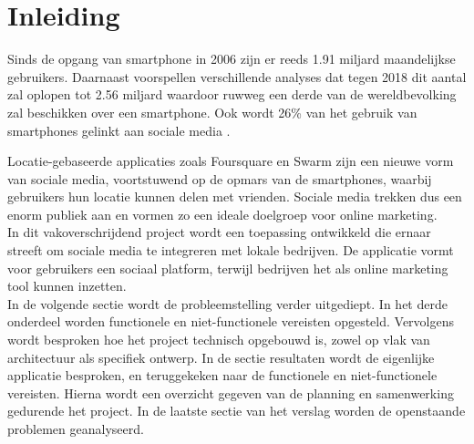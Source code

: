\chapter{Inleiding}

Sinds de opgang van smartphone in 2006 zijn er reeds 1.91 miljard maandelijkse gebruikers. Daarnaast voorspellen verschillende analyses dat tegen 2018 dit aantal zal oplopen tot 2.56 miljard waardoor ruwweg een derde van de wereldbevolking zal beschikken over een smartphone.  Ook wordt 26\% van het gebruik van smartphones gelinkt aan sociale media \cite{smartphone_sales}. 

Locatie-gebaseerde applicaties zoals Foursquare\cite{foursquare} en Swarm\cite{swarm} zijn een nieuwe vorm van sociale media, voortstuwend op de opmars van de smartphones, waarbij gebruikers hun locatie kunnen delen met vrienden.
Sociale media trekken dus een enorm publiek aan en vormen zo een ideale doelgroep voor online marketing.\\

In dit vakoverschrijdend project wordt een toepassing ontwikkeld die ernaar streeft om sociale media te integreren met lokale bedrijven.
De applicatie vormt voor gebruikers een sociaal platform, terwijl bedrijven het als online marketing tool kunnen inzetten.\\

In de volgende sectie wordt de probleemstelling verder uitgediept. In het derde onderdeel worden functionele en niet-functionele vereisten opgesteld. Vervolgens wordt besproken hoe het project technisch opgebouwd is, zowel op vlak van architectuur als specifiek ontwerp. In de sectie resultaten wordt de eigenlijke applicatie besproken, en teruggekeken naar de functionele en niet-functionele vereisten. Hierna wordt een overzicht gegeven van de planning en samenwerking gedurende het project. In de laatste sectie van het verslag worden de openstaande problemen geanalyseerd.